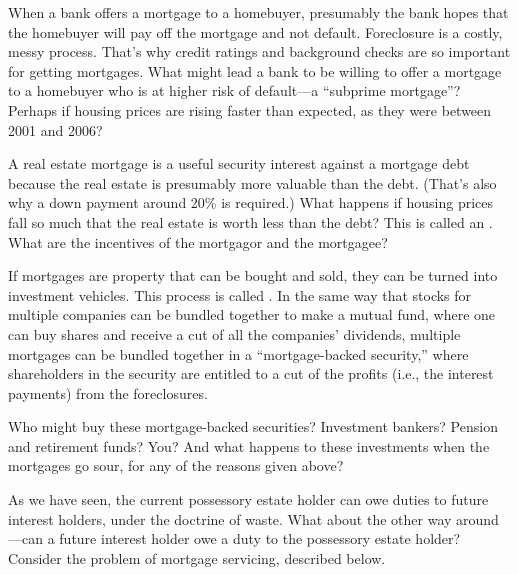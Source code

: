 \item When a bank offers a mortgage to a homebuyer, presumably the bank hopes
that the homebuyer will pay off the mortgage and not default. Foreclosure is a
costly, messy process. That's why credit ratings and background checks are so
important for getting mortgages. What might lead a bank to be willing to offer a
mortgage to a homebuyer who is at higher risk of default---a ``subprime
mortgage''? Perhaps if housing prices are rising faster than expected, as they
were between 2001 and 2006?

\item A real estate mortgage is a useful security interest against a mortgage
debt because the real estate is presumably more valuable than the debt. (That's
also why a down payment around 20\% is required.) What happens if housing prices
fall so much that the real estate is worth less than the debt? This is called an
. What are the incentives of the mortgagor and the
mortgagee?

\item If mortgages are property that can be bought and sold, they can be turned
into investment vehicles. This
process is called
. In the same way
that stocks for multiple companies can be bundled together to make a mutual
fund, where one can buy shares and receive a cut of all the companies'
dividends, multiple mortgages can be bundled together in a ``mortgage-backed
security,'' where shareholders in the security are entitled to a cut of the
profits (i.e., the interest payments) from the
foreclosures.

Who might buy these mortgage-backed securities? Investment bankers? Pension and
retirement funds? You? And what happens to these investments when the mortgages
go sour, for any of the reasons given above?


\item As we have seen, the current possessory estate holder can owe duties to
future interest holders, under the doctrine of waste. What about the other way
around---can a future interest holder owe a duty to the possessory estate
holder? Consider the problem of mortgage servicing, described below.



